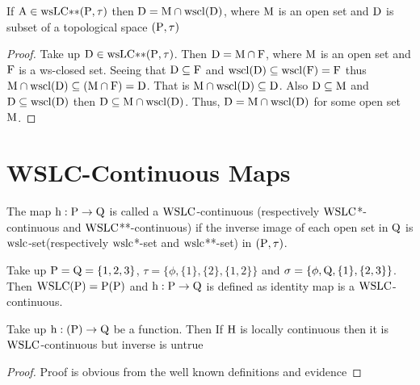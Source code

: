 \begin{thm}\label{thm7.2.12}
If $\mathrm{A} \in \mathrm{ws}\mathrm{LC}{*}{*}(\mathrm{P}, \tau)$ then $\mathrm{D} = \mathrm{M} \cap \mathrm{ws}\mathrm{cl}(\mathrm{D})$, where $\mathrm{M}$ is an open set and $\mathrm{D}$ is subset of a topological space $(\mathrm{P}, \tau)$
\end{thm}

\begin{proof}
Take up $\mathrm{D} \in \mathrm{ws}\mathrm{LC}{*}{*}(\mathrm{P}, \tau)$. Then $\mathrm{D} = \mathrm{M} \cap \mathrm{F}$, where $\mathrm{M}$ is an open set and $\mathrm{F}$ is a ws-closed set. Seeing that $\mathrm{D} \subseteq \mathrm{F}$ and $\mathrm{ws}\mathrm{cl}(\mathrm{D}) \subseteq \mathrm{ws}\mathrm{cl}(\mathrm{F}) = \mathrm{F}$ thus $\mathrm{M} \cap \mathrm{ws}\mathrm{cl}(\mathrm{D}) \subseteq (\mathrm{M} \cap \mathrm{F}) = \mathrm{D}$. That is $\mathrm{M} \cap \mathrm{ws}\mathrm{cl}(\mathrm{D}) \subseteq \mathrm{D}$. Also $\mathrm{D} \subseteq \mathrm{M}$ and $\mathrm{D} \subseteq \mathrm{ws}\mathrm{cl}(\mathrm{D})$ then $\mathrm{D} \subseteq \mathrm{M} \cap \mathrm{ws}\mathrm{cl}(\mathrm{D})$. Thus, $\mathrm{D} = \mathrm{M} \cap \mathrm{ws}\mathrm{cl}(\mathrm{D})$ for some open set $\mathrm{M}$.
\end{proof}

\section{WSLC-Continuous Maps}\label{sec7.3}

\begin{dfn}\label{defi7.3.1}
The map $\mathrm{h}: \mathrm{P} \to \mathrm{Q}$ is called a $\mathrm{WSLC}$-continuous (respectively $\mathrm{WSLC}$*-continuous and $\mathrm{WSLC}${*}{*}-continuous) if the inverse image of each open set in $\mathrm{Q}$ is $\mathrm{ws}\mathrm{lc}$-set(respectively $\mathrm{ws}\mathrm{lc}$*-set and $\mathrm{ws}\mathrm{lc}${*}{*}-set) in $(\mathrm{P}, \tau)$.
\end{dfn}

\begin{exm}\label{exam7.3.1}
Take up $\mathrm{P} = \mathrm{Q} = \{1, 2, 3\}$, $\tau = \{\phi, \{1\}, \{2\}, \{1, 2\}\}$ and $\sigma = \{\phi, \mathrm{Q}, \{1\}, \{2,3\}\}$. Then $\mathrm{WSLC}(\mathrm{P}) = \mathrm{P} (\mathrm{P})$ and $\mathrm{h}: \mathrm{P} \to \mathrm{Q}$ is defined as identity map is a $\mathrm{WSLC}$-continuous.
\end{exm}

\begin{thm}\label{thm7.3.1}
Take up $\mathrm{h}: (\mathrm{P}) \to \mathrm{Q}$ be a function. Then If $\mathrm{H}$ is locally continuous then it is $\mathrm{WSLC}$-continuous but inverse is untrue
\end{thm}

\begin{proof}
Proof is obvious from the well known definitions and evidence
\end{proof}

